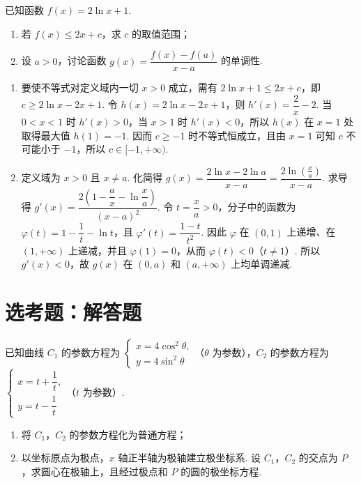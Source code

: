 \begin{problem}
已知函数 \(f(x)=2\ln x+1\).

\begin{enumerate}
\item 若 \(f(x)\le 2x+c\)，求 \(c\) 的取值范围；
\item 设 \(a>0\)，讨论函数 \(g(x)=\dfrac{f(x)-f(a)}{x-a}\) 的单调性.
\end{enumerate}
\end{problem}

\begin{solution}
\begin{enumerate}
\item 要使不等式对定义域内一切 \(x>0\) 成立，需有 \(2\ln x+1\leq2x+c\)，即 \(c\geq2\ln x-2x+1\). 令 \(h(x)=2\ln x-2x+1\)，则 \(h'(x)=\dfrac2x-2\). 当 \(0<x<1\) 时 \(h'(x)>0\)，当 \(x>1\) 时 \(h'(x)<0\)，所以 \(h(x)\) 在 \(x=1\) 处取得最大值 \(h(1)=-1\). 因而 \(c\geq-1\) 时不等式恒成立，且由 \(x=1\) 可知 \(c\) 不可能小于 \(-1\)，所以 \(c\in[-1,+\infty)\).
\item 定义域为 \(x>0\) 且 \(x\ne a\). 化简得 \(g(x)=\dfrac{2\ln x-2\ln a}{x-a}=\dfrac{2\ln(\frac{x}{a})}{x-a}\). 求导得 \(g'(x)=\dfrac{2\left(1-\dfrac ax-\ln\dfrac xa\right)}{(x-a)^2}\). 令 \(t=\dfrac xa>0\)，分子中的函数为 \(\varphi(t)=1-\dfrac1t-\ln t\)，且 \(\varphi'(t)=\dfrac{1-t}{t^2}\). 因此 \(\varphi\) 在 \((0,1)\) 上递增、在 \((1,+\infty)\) 上递减，并且 \(\varphi(1)=0\)，从而 \(\varphi(t)<0\)（\(t\ne1\)）. 所以 \(g'(x)<0\)，故 \(g(x)\) 在 \((0,a)\) 和 \((a,+\infty)\) 上均单调递减.
\end{enumerate}
\end{solution}

\section{选考题：解答题}

\begin{problem}
已知曲线 \(C_1\) 的参数方程为
\(\begin{cases}
x=4\cos^2\theta,\\
y=4\sin^2\theta
\end{cases}\)（\(\theta\) 为参数），\(C_2\) 的参数方程为
\(\begin{cases}
x=t+\dfrac{1}{t},\\
y=t-\dfrac{1}{t}
\end{cases}\)（\(t\) 为参数）.

\begin{enumerate}
\item 将 \(C_1\)，\(C_2\) 的参数方程化为普通方程；
\item 以坐标原点为极点，\(x\) 轴正半轴为极轴建立极坐标系. 设 \(C_1\)，\(C_2\) 的交点为 \(P\)，求圆心在极轴上，且经过极点和 \(P\) 的圆的极坐标方程.
\end{enumerate}
\end{problem}

